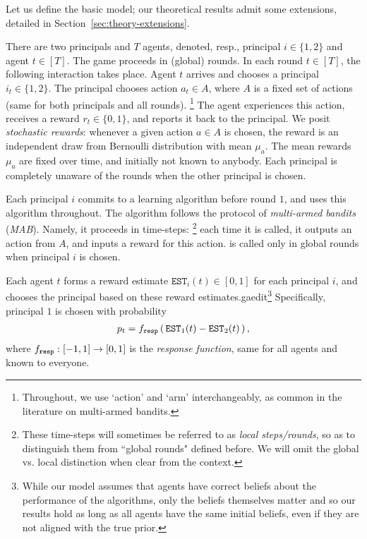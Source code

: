 
Let us define the basic model; our theoretical results admit some extensions, detailed in Section~\ref{sec:theory-extensions}.

 There are two principals and $T$ agents,
denoted, resp., principal $i\in \{1,2\}$ and agent $t\in [T]$. The game proceeds in (global) rounds. In each round $t\in [T]$, the following  interaction takes place. Agent $t$ arrives and chooses a principal $i_t\in \{1,2\}$. The principal chooses action $a_t\in A$, where $A$ is a fixed set of actions (same for both principals and all rounds).%
\footnote{Throughout, we use `action' and `arm' interchangeably, as common in the literature on multi-armed bandits.}
 The agent experiences this action, receives a reward $r_t\in \{ 0,1\}$, and reports it back to the principal. We posit \emph{stochastic rewards}: whenever a given action $a\in A$ is chosen, the reward is an independent draw from Bernoulli distribution with mean $\mu_a$. The mean rewards $\mu_a$ are fixed over time, and initially not known to anybody. Each principal is completely unaware of the rounds when the other principal is chosen.

Each principal $i$ commits to a learning algorithm \alg[i] before round $1$, and uses this algorithm throughout. The algorithm follows the protocol of \emph{multi-armed bandits} (\emph{MAB}). Namely, it proceeds in time-steps:%
\footnote{These time-steps will sometimes be referred to as \emph{local steps/rounds}, so as to distinguish them from ``global rounds" defined before. We will omit the global vs. local distinction when clear from the context.} each time it is called, it outputs an action from $A$, and inputs a reward for this action. \alg[i] is called only in global rounds when principal $i$ is chosen.

\newcommand{\est}{\mathtt{EST}}

 Each agent $t$ forms a reward estimate $\est_i(t)\in [0,1]$ for each principal $i$, and chooses the principal based on these reward estimates.gaedit{\footnote{While our model assumes that agents have correct beliefs about the performance of the algorithms, only the beliefs themselves matter and so our results hold as long as all agents have the same initial beliefs, even if they are not aligned with the true prior.}} Specifically, principal $1$ is chosen with probability
\begin{align}\label{eq:model-f}
p_t = \respF\rbr{ \est_1(t) - \est_2(t) },
\end{align}
where $f_{\mathtt{resp}}:[-1,1]\to [0,1]$ is the \emph{response function}, same for all agents and known to everyone.

